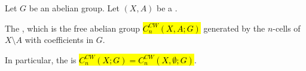 \begin{definition} \label{definition:relative_absolute_group_of_cellular_n_chains_of_a_CW_pair_complex}
Let $G$ be an abelian group. Let $(X, A)$ be a .  

The , which is the free abelian group \hl{$C_n^{CW}(X, A; G)$}  generated by the $n$-cells of $X \setminus A$ with coefficients in $G$.

In particular, the  is \hl{$C_n^{CW}(X; G) = C_n^{CW}(X,\emptyset;G)$}.
\end{definition}